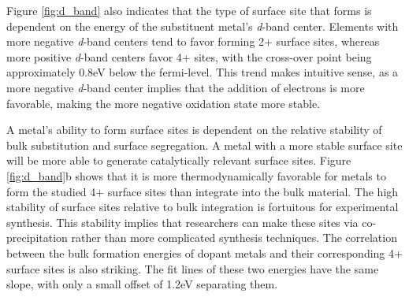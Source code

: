 Figure \ref{fig:d_band} also indicates that the type of surface site that forms is dependent on the energy of the substituent metal's \textit{d}-band center. Elements with more negative \textit{d}-band centers tend to favor forming 2+ surface sites, whereas more positive \textit{d}-band centers favor 4+ sites, with the cross-over point being approximately 0.8eV below the fermi-level. This trend makes intuitive sense, as a more negative \textit{d}-band center implies that the addition of electrons is more favorable, making the more negative oxidation state more stable.

A metal's ability to form surface sites is dependent on the relative stability of bulk substitution and surface segregation. A metal with a more stable surface site will be more able to generate catalytically relevant surface sites. Figure \ref{fig:d_band}b shows that it is more thermodynamically favorable for metals to form the studied 4+ surface sites than integrate into the bulk material. The high stability of surface sites relative to bulk integration is fortuitous for experimental synthesis.   This stability implies that researchers can make these sites via co-precipitation rather than more complicated synthesis techniques. The correlation between the bulk formation energies of dopant metals and their corresponding 4+ surface sites is also striking. The fit lines of these two energies have the same slope, with only a small offset of 1.2eV separating them. %




